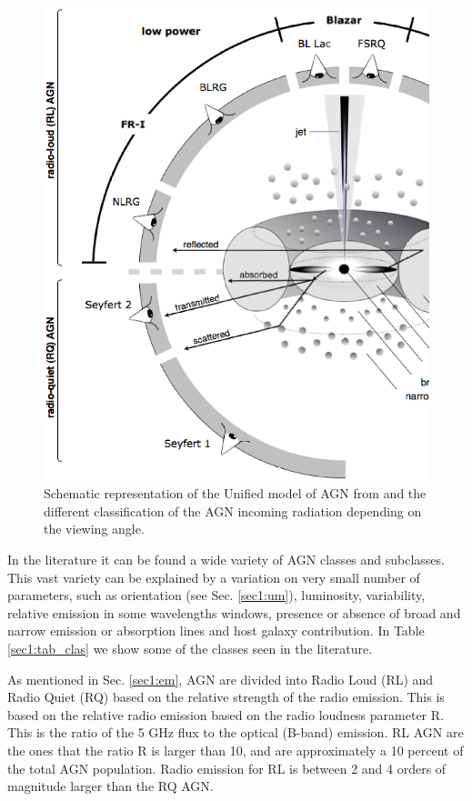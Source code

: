  \begin{figure}
 \centering
 \includegraphics[width=\textwidth]{Chapter1_intro/clasagn.ps}
    \caption{Schematic representation of the Unified model of AGN from \cite{beckmann12} and the different classification of the AGN incoming radiation depending on the viewing angle. }
 \label{sec1:fig_clas}
 \end{figure}



In the literature it can be found a wide variety of AGN classes and subclasses. This vast variety can be explained by a variation on very small number of parameters, such as orientation (see  Sec. \ref{sec1:um}), luminosity, variability, relative emission in some wavelengths windows, presence or absence of broad and narrow emission or absorption lines and host galaxy contribution. In Table \ref{sec1:tab_clas} we show some of the classes seen in the literature.

As mentioned in Sec. \ref{sec1:em}, AGN are divided into Radio Loud (RL) and Radio Quiet (RQ) based on the relative strength of the radio emission. This is based on the relative radio emission based on the radio loudness parameter R. This is the ratio of the 5 GHz flux to the optical (B-band) emission. RL AGN are the ones that the ratio R is larger than 10, and are approximately a 10 percent of the total AGN population. Radio emission for RL is between 2 and 4 orders of magnitude larger than the RQ AGN.

